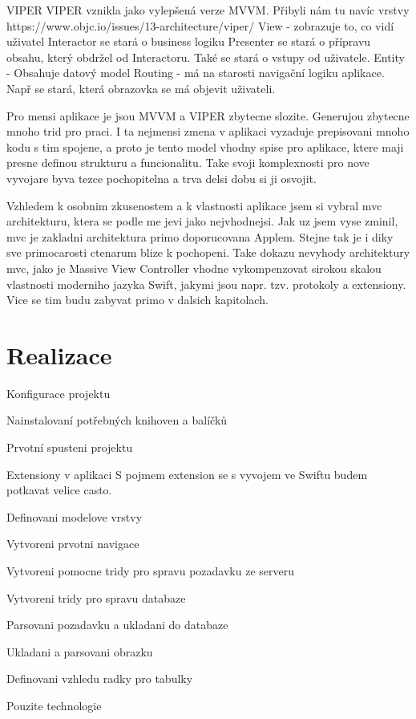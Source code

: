 \documentclass[thesis=B,czech]{FITthesis}[2012/06/26]
\begin{document}
VIPER 
VIPER vznikla jako vylepšená verze MVVM. Přibyli nám tu navíc vrstvy 
https://www.objc.io/issues/13-architecture/viper/
View - zobrazuje to, co vidí uživatel
Interactor se stará o business logiku
Presenter se stará o přípravu obsahu, který obdržel od Interactoru. Také se stará o vstupy od uživatele.
Entity - Obsahuje datový model
Routing - má na starosti navigační logiku aplikace. Např se stará, která obrazovka se má objevit uživateli.


Pro mensi aplikace je jsou MVVM a VIPER zbytecne slozite. Generujou zbytecne mnoho trid pro praci. I ta nejmensi zmena v aplikaci vyzaduje prepisovani mnoho kodu s tim spojene, a proto je tento model vhodny spise pro aplikace, ktere maji presne definou strukturu a funcionalitu. Take svoji komplexnosti pro nove vyvojare byva tezce pochopitelna a trva delsi dobu si ji osvojit.


Vzhledem k osobnim zkusenostem a k vlastnosti aplikace jsem si vybral mvc architekturu, ktera se podle me jevi jako nejvhodnejsi.
Jak uz jsem vyse zminil, mvc je zakladni architektura primo doporucovana Applem. Stejne tak je i diky sve primocarosti ctenarum blize k pochopeni. Take dokazu nevyhody architektury mvc, jako je Massive View Controller vhodne vykompenzovat sirokou skalou vlastnosti moderniho jazyka Swift, jakymi jsou napr. tzv. protokoly a extensiony. Vice se tim budu zabyvat primo v dalsich kapitolach.


\chapter{Realizace}
Konfigurace projektu

Nainstalovaní potřebných knihoven a balíčků


Prvotní spusteni projektu

Extensiony v aplikaci
S pojmem extension se s vyvojem ve Swiftu budem potkavat velice casto.

Definovani modelove vrstvy



Vytvoreni prvotni navigace 

Vytvoreni pomocne tridy pro spravu pozadavku ze serveru

Vytvoreni tridy pro spravu databaze

Parsovani pozadavku a ukladani do databaze


Ukladani a parsovani obrazku


Definovani vzhledu radky pro tabulky


Pouzite technologie
\end{document}
